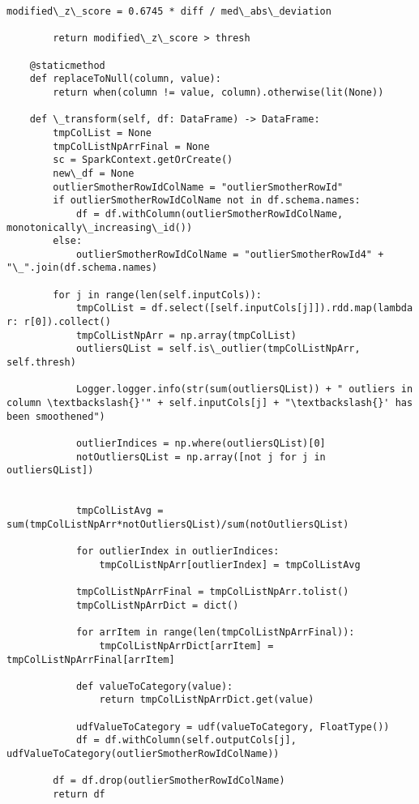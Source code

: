 \documentclass[11pt]{article}
\begin{document}
\begin{Verbatim}[commandchars=\\\{\}]
        modified\_z\_score = 0.6745 * diff / med\_abs\_deviation

        return modified\_z\_score > thresh

    @staticmethod
    def replaceToNull(column, value):
        return when(column != value, column).otherwise(lit(None))

    def \_transform(self, df: DataFrame) -> DataFrame:
        tmpColList = None
        tmpColListNpArrFinal = None
        sc = SparkContext.getOrCreate()
        new\_df = None
        outlierSmotherRowIdColName = "outlierSmotherRowId"
        if outlierSmotherRowIdColName not in df.schema.names:
            df = df.withColumn(outlierSmotherRowIdColName, monotonically\_increasing\_id())
        else:
            outlierSmotherRowIdColName = "outlierSmotherRowId4" + "\_".join(df.schema.names)

        for j in range(len(self.inputCols)):
            tmpColList = df.select([self.inputCols[j]]).rdd.map(lambda r: r[0]).collect()
            tmpColListNpArr = np.array(tmpColList)
            outliersQList = self.is\_outlier(tmpColListNpArr, self.thresh)

            Logger.logger.info(str(sum(outliersQList)) + " outliers in column \textbackslash{}'" + self.inputCols[j] + "\textbackslash{}' has been smoothened")

            outlierIndices = np.where(outliersQList)[0]
            notOutliersQList = np.array([not j for j in outliersQList])


            tmpColListAvg = sum(tmpColListNpArr*notOutliersQList)/sum(notOutliersQList)

            for outlierIndex in outlierIndices:
                tmpColListNpArr[outlierIndex] = tmpColListAvg

            tmpColListNpArrFinal = tmpColListNpArr.tolist()
            tmpColListNpArrDict = dict()

            for arrItem in range(len(tmpColListNpArrFinal)):
                tmpColListNpArrDict[arrItem] = tmpColListNpArrFinal[arrItem]

            def valueToCategory(value):
                return tmpColListNpArrDict.get(value)

            udfValueToCategory = udf(valueToCategory, FloatType())
            df = df.withColumn(self.outputCols[j], udfValueToCategory(outlierSmotherRowIdColName))

        df = df.drop(outlierSmotherRowIdColName)
        return df


    \end{Verbatim}
\end{document}
